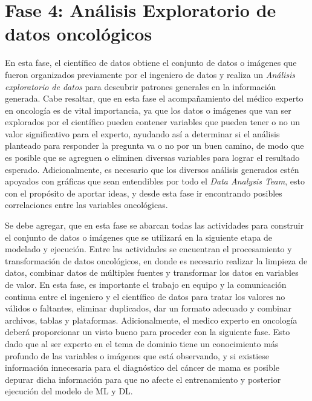 \section{Fase 4: Análisis Exploratorio de datos oncológicos}

En esta fase, el científico de datos obtiene el conjunto de datos o imágenes que fueron organizados previamente por el ingeniero de datos y realiza un \textit{Análisis exploratorio de datos} para descubrir patrones generales en la información generada. Cabe resaltar, que en esta fase el acompañamiento del médico experto en oncología es de vital importancia, ya que los datos o imágenes que van ser explorados por el científico pueden contener variables que pueden tener o no un valor significativo para el experto, ayudando así a determinar si el análisis planteado para responder la pregunta va o no por un buen camino, de modo que es posible que se agreguen o eliminen diversas variables para lograr el resultado esperado. Adicionalmente, es necesario que los diversos análisis generados estén apoyados con gráficas que sean entendibles por todo el \textit{Data Analysis Team}, esto con el propósito de aportar ideas, y desde esta fase ir encontrando posibles correlaciones entre las variables oncológicas.

Se debe agregar, que en esta fase se abarcan todas las actividades para construir el conjunto de datos o imágenes que se utilizará en la siguiente etapa de modelado y ejecución. Entre las actividades se encuentran el procesamiento y transformación de datos oncológicos, en donde es necesario realizar la limpieza de datos, combinar datos de múltiples fuentes y transformar los datos en variables de valor. En esta fase, es importante el trabajo en equipo y la comunicación continua entre el ingeniero y el científico de datos para tratar los valores no válidos o faltantes, eliminar duplicados, dar un formato adecuado y combinar archivos, tablas y plataformas. Adicionalmente, el medico experto en oncología deberá proporcionar un visto bueno para proceder con la siguiente fase. Esto dado que al ser experto en el tema de dominio tiene un conocimiento más profundo de las variables o imágenes que está observando, y si existiese información innecesaria para el diagnóstico del cáncer de mama es posible depurar dicha información para que no afecte el entrenamiento y posterior ejecución del modelo de ML y DL.











